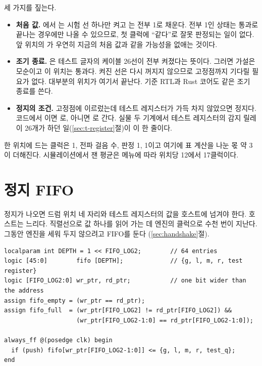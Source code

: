 \Ours 세 가지를 짚는다.

\begin{itemize}
\item \textbf{처음 값.} 에서 는 시험 선 하나만 켜고 는 전부 1로
채운다. 전부 1인 상태는 통과로 끝나는 경우에만 나올 수 있으므로, 첫 클럭에 ``같다''로 잘못 판정되는 일이
없다. 앞 위치의 가 우연히 지금의 처음 값과 같을 가능성을 없애는 것이다.
\item \textbf{조기 종료.} 은 테스트 글자의 케이블 26선이 전부 켜졌다는 뜻이다. 그러면
가설은 모순이고 이 위치는 통과다. 켜진 선은 다시 꺼지지 않으므로 고정점까지 기다릴 필요가 없다. 대부분의
위치가 여기서 끝난다. 기준 RTL과 Rust 코어도 같은 조기 종료를 쓴다.
\item \textbf{정지의 조건.} 고정점에 이르렀는데 테스트 레지스터가 가득 차지 않았으면 정지다. 코드에서
이면 로, 아니면 로 간다. 실물 두 기계에서 테스트 레지스터의 감지
릴레이 26개가 하던 일(\ref{sec:t-register}절)이 이 한 줄이다.
\end{itemize}

한 위치에 드는 클럭은  1, 전파 걸음 수, 판정 1,  1이고 여기에 표 계산을 나눈
몫 약 3이 더해진다. 시뮬레이션에서 잰 평균은 메뉴에 따라 위치당 12에서 17클럭이다.

\section{정지 FIFO}\label{sec:e-fifo}

정지가 나오면 드럼 위치 네 자리와 테스트 레지스터의 값을 호스트에 넘겨야 한다. 호스트는 느리다. 직렬선으로
값 하나를 읽어 가는 데 엔진의 클럭으로 수천 번이 지난다. 그동안 엔진을 세워 두지 않으려고 FIFO를 둔다
(\ref{sec:handshake}절).

\begin{lstlisting}[language=SV,caption={\code{bombe\_engine.sv}: 정지 FIFO.},label={lst:e-fifo}]
localparam int DEPTH = 1 << FIFO_LOG2;        // 64 entries
logic [45:0]        fifo [DEPTH];             // {g, l, m, r, test register}
logic [FIFO_LOG2:0] wr_ptr, rd_ptr;           // one bit wider than the address
assign fifo_empty = (wr_ptr == rd_ptr);
assign fifo_full  = (wr_ptr[FIFO_LOG2] != rd_ptr[FIFO_LOG2]) &&
                    (wr_ptr[FIFO_LOG2-1:0] == rd_ptr[FIFO_LOG2-1:0]);

always_ff @(posedge clk) begin
  if (push) fifo[wr_ptr[FIFO_LOG2-1:0]] <= {g, l, m, r, test_q};
end
\end{lstlisting}

